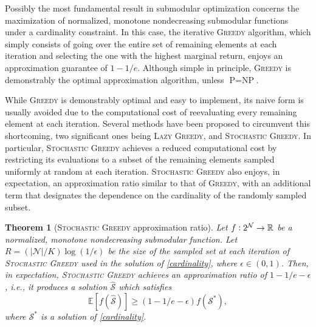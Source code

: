 \documentclass[letter,11pt]{article}
\newtheorem{theorem}{Theorem}[]
\DeclareMathOperator{\E}{\mathbb{E}}
\def\E{\mathbb{E}}
\def\sS{\mathcal{S}}
\def\sN{\mathcal{N}}
\begin{document}
Possibly the most fundamental result in submodular optimization concerns the maximization of normalized, monotone nondecreasing submodular functions under a cardinality constraint. In this case, the iterative \textsc{Greedy} algorithm, which simply consists of going over the entire set of remaining elements at each iteration and selecting the one with the highest marginal return, enjoys an approximation guarantee of $1-1/e$. Although simple in principle, \textsc{Greedy} is demonstrably the optimal approximation algorithm, unless $\text{P}=\text{NP}$.\cite{nemhauser1978analysis} 

While \textsc{Greedy} is demonstrably optimal and easy to implement, its naive form is usually avoided due to the computational cost of reevaluating every remaining element at each iteration. Several methods have been proposed to circumvent this shortcoming, two significant ones being \textsc{Lazy Greedy}\cite{lazygreedy}, and \textsc{Stochastic Greedy}\cite{mirzasoleiman2015lazier}. In particular, \textsc{Stochastic Greedy} achieves a reduced computational cost by restricting its evaluations to a subset of the remaining elements sampled uniformly at random at each iteration. \textsc{Stochastic Greedy} also enjoys, in expectation, an approximation ratio similar to that of \textsc{Greedy}, with an additional term that designates the dependence on the cardinality of the randomly sampled subset.
\begin{theorem}[\textsc{Stochastic Greedy} approximation ratio\label{thm:stoch-greedy}\cite{mirzasoleiman2015lazier}]
Let $f\vcentcolon 2^\sN \rightarrow \mathbb{R}$ be a normalized, monotone nondecreasing submodular function. Let $R = (\lvert \sN\rvert/K)\log(1/\epsilon)$ be the size of the sampled set at each iteration of \textsc{Stochastic Greedy} used in the solution of \eqref{cardinality}, where $\epsilon \in (0, 1)$. Then, in expectation, \textsc{Stochastic Greedy} achieves an approximation ratio of $1-1/e-\epsilon$, i.e., it produces a solution $\hat{\sS}$ which satisfies
\begin{equation}
    \E[f(\hat{\sS})] \geq (1 - 1/e - \epsilon) f(\sS^\ast),
\end{equation}
where $\sS^*$ is a solution of \eqref{cardinality}.
\end{theorem}
\end{document}
